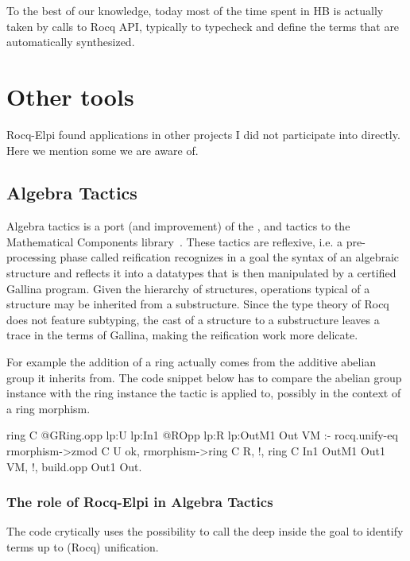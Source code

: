 \documentclass[a4paper, 11pt]{book}
\begin{document}
To the best of our knowledge, today most of the time spent in HB is actually taken
by calls to Rocq API, typically to typecheck and define the terms that are
automatically synthesized.

\section{Other tools}

Rocq-Elpi found applications in other projects I did not participate
into directly. Here we mention some we are aware of.

\subsection{Algebra Tactics}

Algebra tactics is a port (and improvement) of the ,  and
 tactics to the Mathematical Components library~\cite{sakaguchi:LIPIcs.ITP.2022.29}.
These tactics are reflexive, i.e. a pre-processing phase called reification
recognizes in a goal the syntax of an algebraic structure and reflects it into
a datatypes that is then manipulated by a certified Gallina program.
Given the hierarchy of structures, operations typical of a structure may be
inherited from a substructure. Since the type theory of Rocq does not feature
subtyping, the cast of a structure to a substructure leaves a trace in
the terms of Gallina, making the reification work more delicate.

For example the addition of a ring actually comes from the
additive abelian group it inherits from. The code snippet below
has to compare the abelian group instance  with the ring
instance  the tactic is applied to, possibly in the context
 of a ring morphism.

\begin{elpicode}
ring C {{ @GRing.opp lp:U lp:In1 }} {{ @ROpp lp:R lp:OutM1 }} Out VM :-
  rocq.unify-eq { rmorphism->zmod C } U ok,
  rmorphism->ring C R, !,
  ring C In1 OutM1 Out1 VM, !,
  build.opp Out1 Out.  
\end{elpicode}

\subsubsection{The role of Rocq-Elpi in Algebra Tactics}

The code crytically uses the possibility to call
the  deep inside the goal to identify
terms up to (Rocq) unification.
\end{document}
